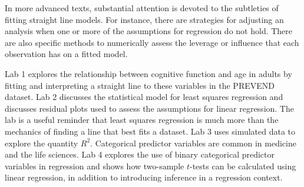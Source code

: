 In more advanced texts, substantial attention is devoted to the subtleties of fitting straight line models. For instance, there are strategies for adjusting an analysis when one or more of the assumptions for regression do not hold. There are also specific methods to numerically assess the leverage or influence that each observation has on a fitted model.

Lab 1 explores the relationship between cognitive function and age in adults by fitting and interpreting a straight line to these variables in the PREVEND dataset.  Lab 2 discusses the statistical model for least squares regression and discusses residual plots used to assess the assumptions for linear regression.  The lab is a useful reminder that least squares regression is much more than the mechanics of finding a line that best fits a dataset.  Lab 3 uses simulated data to explore the quantity $R^2$.  Categorical predictor variables are common in medicine and the life sciences.  Lab 4 explores the use of binary categorical predictor variables in regression and shows how two-sample $t$-tests can be calculated using linear regression, in addition to introducing inference in a regression context.

